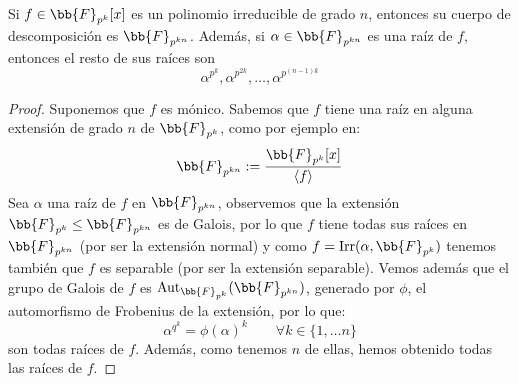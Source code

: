 \begin{teo}
    Si $f\in \bb{F}_{p^k}[x]$ es un polinomio irreducible de grado $n$, entonces su cuerpo de descomposición  es $\bb{F}_{p^{kn}}$. Además, si $\alpha\in \bb{F}_{p^{kn}}$ es una raíz de $f$, entonces el resto de sus raíces son
    \begin{equation*}
        \alpha^{p^k}, \alpha^{p^{2k}}, \ldots, \alpha^{p^{(n-1)k}}
    \end{equation*}
    \begin{proof}
        Suponemos que $f$ es mónico. Sabemos que $f$ tiene una raíz en alguna extensión de grado $n$ de $\bb{F}_{p^k}$, como por ejemplo en:
        \begin{equation*}
            \bb{F}_{p^{kn}} := \frac{\bb{F}_{p^k}[x]}{\langle f \rangle }
        \end{equation*}
        Sea $\alpha$ una raíz de $f$ en $\bb{F}_{p^{kn}}$, observemos que la extensión $\bb{F}_{p^k}\leq \bb{F}_{p^{kn}}$ es de Galois, por lo que $f$ tiene todas sus raíces en $\bb{F}_{p^{kn}}$ (por ser la extensión normal) y como $f = \Irr(\alpha,\bb{F}_{p^k})$ tenemos también que $f$ es separable (por ser la extensión separable). Vemos además que el grupo de Galois de $f$ es $\Aut_{\bb{F}_{p^k}}(\bb{F}_{p^{kn}})$, generado por $\phi$, el automorfismo de Frobenius de la extensión, por lo que:
        \begin{equation*}
            \alpha^{q^k} = \phi(\alpha)^k  \qquad \forall k \in \{1,\ldots n\}
        \end{equation*}
        son todas raíces de $f$. Además, como tenemos $n$ de ellas, hemos obtenido todas las raíces de $f$.
    \end{proof}
\end{teo}

